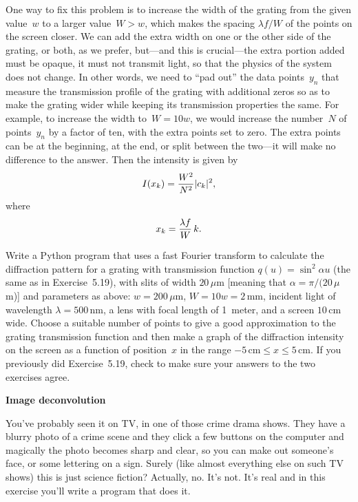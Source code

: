 \documentclass[12pt]{article}
\begin{document}
\begin{exercises}
One way to fix this problem is to increase the width of the grating from
the given value~$w$ to a larger value~$W>w$, which makes the spacing
$\lambda f/W$ of the points on the screen closer.  We can add the extra
width on one or the other side of the grating, or both, as we prefer,
but---and this is crucial---the extra portion added must be opaque, it must
not transmit light, so that the physics of the system does not change.  In
other words, we need to ``pad out'' the data points~$y_n$ that measure the
transmission profile of the grating with additional zeros so as to make the
grating wider while keeping its transmission properties the same.  For
example, to increase the width to~$W=10w$, we would increase the number~$N$
of points~$y_n$ by a factor of ten, with the extra points set to zero.  The
extra points can be at the beginning, at the end, or split between the
two---it will make no difference to the answer.  Then the intensity is
given by
\begin{displaymath}
I(x_k) = {W^2\over N^2} |c_k|^2,
\end{displaymath}
where
\begin{displaymath}
x_k = {\lambda f\over W}\,k.
\end{displaymath}

Write a Python program that uses a fast Fourier transform to calculate the
diffraction pattern for a grating with transmission function $q(u) = \sin^2
\alpha u$ (the same as in Exercise~5.19), with slits of width $20\,\mu$m
[meaning that $\alpha=\pi/(20\,\mu$m)] and parameters as above:
$w=200\,\mu$m, $W=10w=2\,$mm, incident light of wavelength
$\lambda=500\,$nm, a lens with focal length of 1~meter, and a screen
$10\,$cm wide.  Choose a suitable number of points to give a good
approximation to the grating transmission function and then make a graph of
the diffraction intensity on the screen as a function of position~$x$ in
the range $-5\,$cm${}\le x\le 5\,$cm.  If you previously did Exercise~5.19,
check to make sure your answers to the two exercises agree.



\exercise \textbf{Image deconvolution}

\exskip You've probably seen it on TV, in one of those crime drama shows.
They have a blurry photo of a crime scene and they click a few buttons on
the computer and magically the photo becomes sharp and clear, so you can
make out someone's face, or some lettering on a sign.  Surely (like almost
everything else on such TV shows) this is just science fiction?  Actually,
no.  It's not.  It's real and in this exercise you'll write a program that
does it.


\end{exercises}
\end{document}
